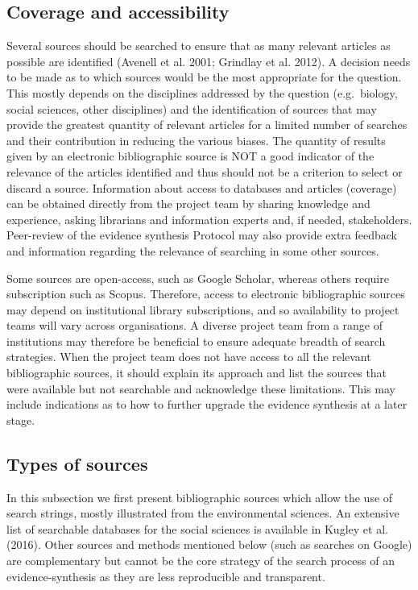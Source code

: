 \documentclass[
  letterpaper,
  DIV=11,
  numbers=noendperiod]{scrreprt}
\begin{document}
\subsection{Coverage and
accessibility}\label{coverage-and-accessibility}

Several sources should be searched to ensure that as many relevant
articles as possible are identified (Avenell et al. 2001; Grindlay et
al. 2012). A decision needs to be made as to which sources would be the
most appropriate for the question. This mostly depends on the
disciplines addressed by the question (e.g.~biology, social sciences,
other disciplines) and the identification of sources that may provide
the greatest quantity of relevant articles for a limited number of
searches and their contribution in reducing the various biases. The
quantity of results given by an electronic bibliographic source is NOT a
good indicator of the relevance of the articles identified and thus
should not be a criterion to select or discard a source. Information
about access to databases and articles (coverage) can be obtained
directly from the project team by sharing knowledge and experience,
asking librarians and information experts and, if needed, stakeholders.
Peer-review of the evidence synthesis Protocol may also provide extra
feedback and information regarding the relevance of searching in some
other sources.

Some sources are open-access, such as Google Scholar, whereas others
require subscription such as Scopus. Therefore, access to electronic
bibliographic sources may depend on institutional library subscriptions,
and so availability to project teams will vary across organisations. A
diverse project team from a range of institutions may therefore be
beneficial to ensure adequate breadth of search strategies. When the
project team does not have access to all the relevant bibliographic
sources, it should explain its approach and list the sources that were
available but not searchable and acknowledge these limitations. This may
include indications as to how to further upgrade the evidence synthesis
at a later stage.

\subsection{Types of sources}\label{types-of-sources}

In this subsection we first present bibliographic sources which allow
the use of search strings, mostly illustrated from the environmental
sciences. An extensive list of searchable databases for the social
sciences is available in Kugley et al. (2016). Other sources and methods
mentioned below (such as searches on Google) are complementary but
cannot be the core strategy of the search process of an
evidence-synthesis as they are less reproducible and transparent.
\end{document}
